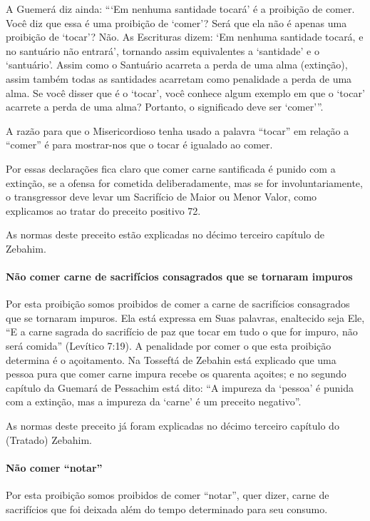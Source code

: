 A Guemerá diz ainda: ```Em nenhuma santidade tocará' é a proibição de
comer. Você diz que essa é uma proibição de `comer'? Será que ela não é
apenas uma proibição de `tocar'? Não. As Escrituras dizem: `Em nenhuma
santidade tocará, e no santuário não entrará', tornando assim
equivalentes a `santidade' e o `santuário'. Assim como o Santuário
acarreta a perda de uma alma (extinção), assim também todas as
santidades acarretam como penalidade a perda de uma alma. Se você disser
que é o `tocar', você conhece algum exemplo em que o `tocar' acarrete a
perda de uma alma? Portanto, o significado deve ser `comer'''.

A razão para que o Misericordioso tenha usado a palavra ``tocar'' em
relação a ``comer'' é para mostrar-nos que o tocar é igualado ao comer.

Por essas declarações fica claro que comer carne santificada é punido
com a extinção, se a ofensa for cometida deliberadamente, mas se for
involuntariamente, o transgressor deve levar um Sacrifício de Maior ou
Menor Valor, como explicamos ao tratar do preceito positivo 72.

As normas deste preceito estão explicadas no décimo terceiro capítulo
de Zebahim.

\paragraph{Não comer carne de sacrifícios consagrados que se tornaram impuros}

Por esta proibição somos proibidos de comer a carne de sacrifícios
consagrados que se tornaram impuros. Ela está expressa em Suas palavras,
enaltecido seja Ele, ``E a carne sagrada do sacrifício de paz que tocar
em tudo o que for impuro, não será comida'' (Levítico 7:19). A
penalidade por comer o que esta proibição determina é o açoitamento. Na
Tosseftá de Zebahin está explicado que uma pessoa pura que comer carne
impura recebe os quarenta açoites; e no segundo capítulo da Guemará de Pessachim está dito: ``A
impureza da `pessoa' é punida com a extinção, mas a impureza da `carne'
é um preceito negativo''.

As normas deste preceito já foram explicadas no décimo terceiro capítulo
do (Tratado) Zebahim.

\paragraph{Não comer ``notar''}

Por esta proibição somos proibidos de comer ``notar'', quer dizer, carne
de sacrifícios que foi deixada além do tempo determinado para seu
consumo.

